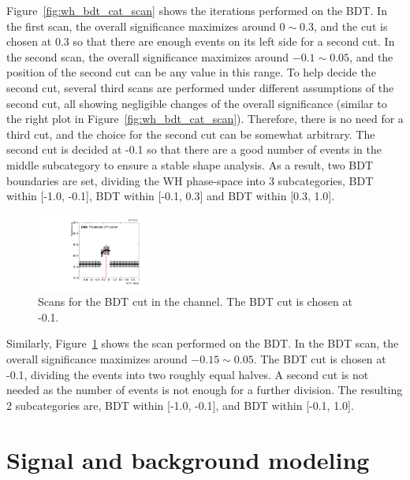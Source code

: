 Figure~\ref{fig:wh_bdt_cat_scan} shows the iterations performed on the \WH BDT. 
In the first scan, the overall significance maximizes around $0 \sim 0.3$, 
and the cut is chosen at 0.3 so that there are enough events on its left side for a second cut.
In the second scan, the overall significance maximizes around $-0.1 \sim 0.05$,
and the position of the second cut can be any value in this range.
To help decide the second cut, several third scans are performed under different assumptions of the second cut,
all showing negligible changes of the overall significance (similar to the right plot in Figure~\ref{fig:wh_bdt_cat_scan}).
Therefore, there is no need for a third cut, and the choice for the second cut can be somewhat arbitrary.
The second cut is decided at -0.1 so that there are a good number of events in the middle subcategory to ensure a stable shape analysis.  
As a result, two BDT boundaries are set, dividing the WH phase-space into 3 subcategories, 
BDT within [-1.0, -0.1], BDT within [-0.1, 0.3] and BDT within [0.3, 1.0].

\begin{figure}[!htb]
  \centering
  \captionsetup{justification=centering}
  \includegraphics[width=0.32\textwidth]{pics/VH_sec/VH_BDT_cats/ZH_BDT_scan.pdf}
  \caption{Scans for the BDT cut in the \ZH channel. The BDT cut is chosen at -0.1.}
  \label{fig:zh_bdt_cat_scan}
\end{figure}

Similarly, Figure~\ref{fig:zh_bdt_cat_scan} shows the scan performed on the \ZH BDT. 
In the BDT scan, the overall significance maximizes around $-0.15 \sim 0.05$.
The BDT cut is chosen at -0.1, dividing the \ZH events into two roughly equal halves.
A second cut is not needed as the number of events is not enough for a further division.
The resulting 2 \ZH subcategories are, BDT within [-1.0, -0.1], and BDT within [-0.1, 1.0].


\section{Signal and background modeling}\label{sec:vh_sig_bkg_model}

